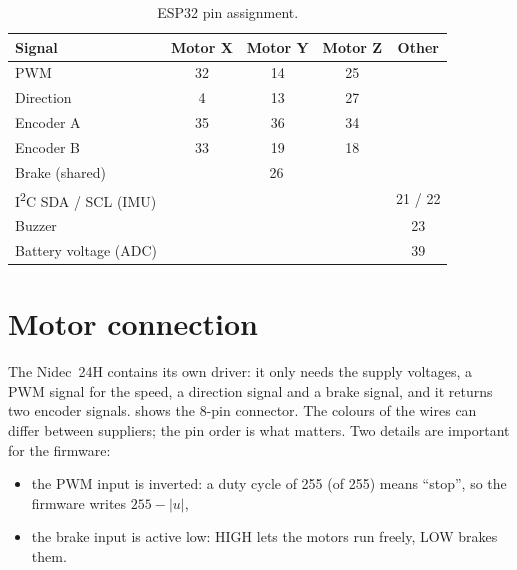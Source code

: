 \begin{table}[htbp]
  \centering
  \caption{ESP32 pin assignment.}
  \label{tab:pins}
  \begin{tabular}{lcccc}
    \toprule
    Signal & Motor X & Motor Y & Motor Z & Other \\
    \midrule
    PWM        & 32 & 14 & 25 & \\
    Direction  & 4  & 13 & 27 & \\
    Encoder A  & 35 & 36 & 34 & \\
    Encoder B  & 33 & 19 & 18 & \\
    Brake (shared)        & \multicolumn{3}{c}{26} & \\
    I\textsuperscript{2}C SDA / SCL (IMU) & & & & 21 / 22 \\
    Buzzer                & & & & 23 \\
    Battery voltage (ADC) & & & & 39 \\
    \bottomrule
  \end{tabular}
\end{table}

\section{Motor connection}

The Nidec~24H contains its own driver: it only needs the supply voltages, a PWM signal for the
speed, a direction signal and a brake signal, and it returns two encoder signals.
 shows the 8-pin connector. The colours of the wires can differ between
suppliers; the pin order is what matters. Two details are important for the firmware:
\begin{itemize}
  \item the PWM input is inverted: a duty cycle of 255 (of 255) means \enquote{stop}, so the
        firmware writes $255 - |u|$,
  \item the brake input is active low: HIGH lets the motors run freely, LOW brakes them.
\end{itemize}

